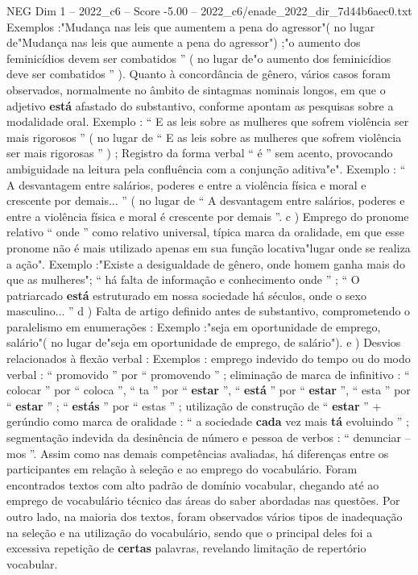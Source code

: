 \begin{textsample}{NEG Dim 1 – 2022\_c6 – Score -5.00 – 2022\_c6/enade\_2022\_dir\_7d44b6aec0.txt}
Exemplos :"Mudança nas leis que aumentem a pena do agressor"( no lugar de"Mudança nas leis que aumente a pena do agressor") ;"o aumento dos feminicídios devem ser combatidos ” ( no lugar de"o aumento dos feminicídios deve ser combatidos ” ).
Quanto à concordância de gênero, vários casos foram observados, normalmente no âmbito de sintagmas nominais longos, em que o adjetivo \textbf{está} afastado do substantivo, conforme apontam as pesquisas sobre a modalidade oral.
Exemplo : “ E as leis sobre as mulheres que sofrem violência ser mais rigorosos ” ( no lugar de “ E as leis sobre as mulheres que sofrem violência ser mais rigorosas ” ) ; Registro da forma verbal “ é ” sem acento, provocando ambiguidade na leitura pela confluência com a conjunção aditiva"e".
Exemplo : “ A desvantagem entre salários, poderes e entre a violência física e moral e crescente por demais... ” ( no lugar de “ A desvantagem entre salários, poderes e entre a violência física e moral é crescente por demais ”. c ) Emprego do pronome relativo “ onde ” como relativo universal, típica marca da oralidade, em que esse pronome não é mais utilizado apenas em sua função locativa"lugar onde se realiza a ação".
Exemplo :"Existe a desigualdade de gênero, onde homem ganha mais do que as mulheres"; “ há falta de informação e conhecimento onde ” ; “ O patriarcado \textbf{está} estruturado em nossa sociedade há séculos, onde o sexo masculino... ” d ) Falta de artigo definido antes de substantivo, comprometendo o paralelismo em enumerações : Exemplo :"seja em oportunidade de emprego, salário"( no lugar de"seja em oportunidade de emprego, de salário"). e ) Desvios relacionados à flexão verbal : Exemplos : emprego indevido do tempo ou do modo verbal : “ promovido ” por “ promovendo ” ; eliminação de marca de infinitivo : “ colocar ” por “ coloca ”, “ ta ” por “ \textbf{estar} ”, “ \textbf{está} ” por “ \textbf{estar} ”, “ esta ” por “ \textbf{estar} ” ; “ \textbf{estás} ” por “ estas ” ; utilização de construção de “ \textbf{estar} ” + gerúndio como marca de oralidade : “ a sociedade \textbf{cada} vez mais \textbf{tá} evoluindo ” ; segmentação indevida da desinência de número e pessoa de verbos : “ denunciar – mos ”.
Assim como nas demais competências avaliadas, há diferenças entre os participantes em relação à seleção e ao emprego do vocabulário.
Foram encontrados textos com alto padrão de domínio vocabular, chegando até ao emprego de vocabulário técnico das áreas do saber abordadas nas questões.
Por outro lado, na maioria dos textos, foram observados vários tipos de inadequação na seleção e na utilização do vocabulário, sendo que o principal deles foi a excessiva repetição de \textbf{certas} palavras, revelando limitação de repertório vocabular.

\end{textsample}
